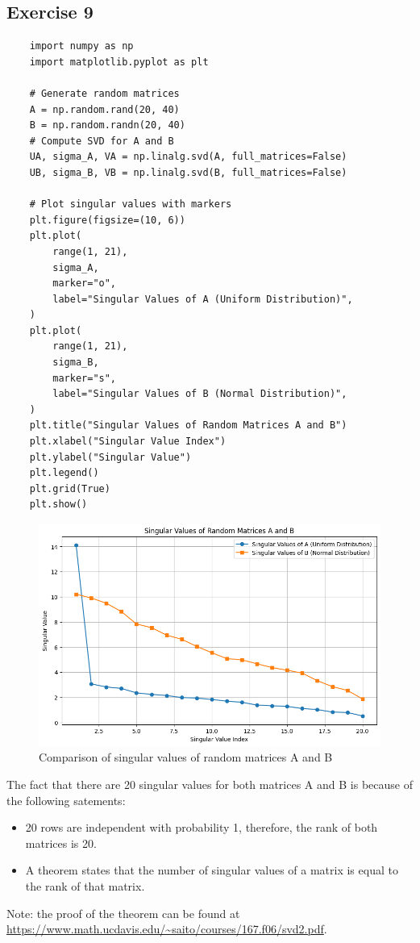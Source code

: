 \documentclass{article}
\begin{document}
\subsection{Exercise 9}
\begin{verbatim}
    import numpy as np
    import matplotlib.pyplot as plt

    # Generate random matrices
    A = np.random.rand(20, 40)
    B = np.random.randn(20, 40)
    # Compute SVD for A and B
    UA, sigma_A, VA = np.linalg.svd(A, full_matrices=False)
    UB, sigma_B, VB = np.linalg.svd(B, full_matrices=False)

    # Plot singular values with markers
    plt.figure(figsize=(10, 6))
    plt.plot(
        range(1, 21),
        sigma_A,
        marker="o",
        label="Singular Values of A (Uniform Distribution)",
    )
    plt.plot(
        range(1, 21),
        sigma_B,
        marker="s",
        label="Singular Values of B (Normal Distribution)",
    )
    plt.title("Singular Values of Random Matrices A and B")
    plt.xlabel("Singular Value Index")
    plt.ylabel("Singular Value")
    plt.legend()
    plt.grid(True)
    plt.show()
\end{verbatim}

\begin{figure}[ht]
    \centering
    \includegraphics[width=1\textwidth]{img/singular_value_index.png}
    \caption{Comparison of singular values of random matrices A and B}
    \label{fig:singular_value_index}
\end{figure}

The fact that there are 20 singular values for both matrices A and B is because of the following satements:

\begin{itemize}
    \item 20 rows are independent with probability 1, therefore, the rank of both matrices is 20.
    \item A theorem states that the number of singular values of a matrix is equal to the rank of that matrix.
\end{itemize}

Note: the proof of the theorem can be found at \\
\url{https://www.math.ucdavis.edu/~saito/courses/167.f06/svd2.pdf}.
\end{document}
